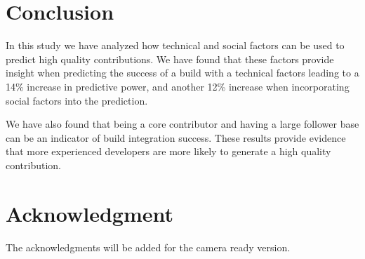 \documentclass[10pt, conference]{IEEEtran}
\begin{document}
\section{Conclusion}
In this study we have analyzed how technical and social factors can be used to
predict high quality contributions.  We have found that these factors provide
insight when predicting the success of a build with a technical factors leading
to a 14\% increase in predictive power, and another 12\% increase when
incorporating social factors into the prediction.

We have also found that being a core contributor and having a large follower
base can be an indicator of build integration success.
These results provide evidence that more experienced
developers are more likely to generate a high quality contribution.


\section*{Acknowledgment}

The acknowledgments will be added for the camera ready version.




%
%
%





\end{document}
